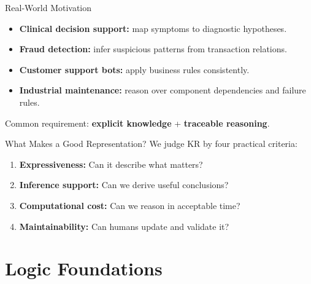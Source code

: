 \documentclass[10pt]{beamer}
\begin{document}
\begin{frame}{Real-World Motivation}
    \begin{itemize}
        \item \textbf{Clinical decision support:} map symptoms to diagnostic hypotheses.
        \item \textbf{Fraud detection:} infer suspicious patterns from transaction relations.
        \item \textbf{Customer support bots:} apply business rules consistently.
        \item \textbf{Industrial maintenance:} reason over component dependencies and failure rules.
    \end{itemize}
    \vspace{0.25cm}
    Common requirement: \textbf{explicit knowledge} + \textbf{traceable reasoning}.
\end{frame}

\begin{frame}{What Makes a Good Representation?}
    We judge KR by four practical criteria:
    \begin{enumerate}
        \item \textbf{Expressiveness:} Can it describe what matters?
        \item \textbf{Inference support:} Can we derive useful conclusions?
        \item \textbf{Computational cost:} Can we reason in acceptable time?
        \item \textbf{Maintainability:} Can humans update and validate it?
    \end{enumerate}
\end{frame}

\section{Logic Foundations}
\end{document}
